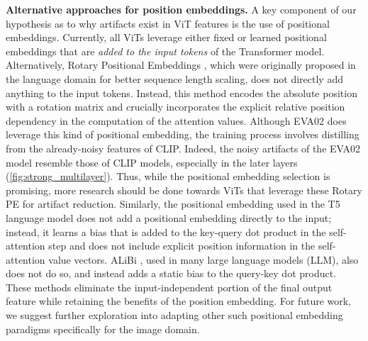 \documentclass[runningheads]{llncs}
\renewcommand{\paragraph}[1]{\vspace{1.25mm}\noindent\textbf{#1}}
\begin{document}
\paragraph{Alternative approaches for position embeddings.} A key component of our hypothesis as to why artifacts exist in ViT features is the use of positional embeddings. Currently, all ViTs leverage either fixed \cite{he2022masked} or learned \cite{Caron_2021, oquab2023dinov2, touvron2022deit} positional embeddings that are \textit{added to the input tokens} of the Transformer model.
Alternatively, Rotary Positional Embeddings \cite{su2023roformer}, which were originally proposed in the language domain for better sequence length scaling, does not directly add anything to the input tokens. Instead, this method encodes the absolute position with a rotation matrix and crucially incorporates the explicit relative position dependency in the computation of the attention values.
Although EVA02 \cite{fang2023eva} does leverage this kind of positional embedding, the training process involves distilling from the already-noisy features of CLIP. Indeed, the noisy artifacts of the EVA02 model resemble those of CLIP models, especially in the later layers (\cref{fig:strong_multilayer}).
Thus, while the positional embedding selection is promising, more research should be done towards ViTs that leverage these Rotary PE for artifact reduction.
Similarly, the positional embedding used in the T5 language model \cite{raffel2023exploring} does not add a positional embedding directly to the input; instead, it learns a bias that is added to the key-query dot product in the self-attention step and does not include explicit position information in the self-attention value vectors. ALiBi \cite{press2022train}, used in many large language models (LLM), also does not do so, and instead adds a static bias to the query-key dot product. These methods eliminate the input-independent portion of the final output feature while retaining the benefits of the position embedding. For future work, we suggest further exploration into adapting other such positional embedding paradigms specifically for the image domain.
\end{document}
